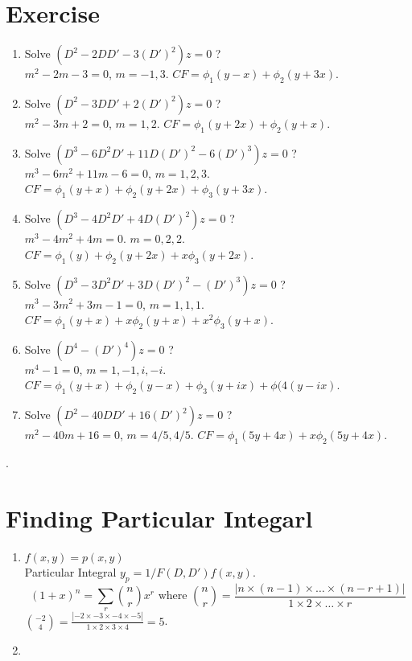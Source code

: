 \section*{Exercise}
\begin{enumerate}
	\item Solve $(D^2-2DD' - 3(D')^2)z = 0$ ?\\
	$m^2 - 2m - 3 = 0$, $m = -1,3$.
	$CF = \phi_1(y-x) + \phi_2(y+3x)$.
	\item Solve $(D^2 -3DD' + 2(D')^2)z = 0$ ?\\
	$m^2 - 3m + 2 = 0$, $m = 1,2$.
	$CF = \phi_1(y+2x) + \phi_2(y+x)$.
	\item Solve $(D^3-6D^2D' + 11D(D')^2 - 6(D')^3)z = 0$ ?\\
	$m^3 - 6m^2 + 11m - 6 = 0$, $m = 1, 2, 3$.
	$CF = \phi_1(y+x) + \phi_2(y+2x) + \phi_3(y+3x)$.
	\item Solve  $(D^3 - 4D^2D' + 4D(D')^2)z = 0$ ?\\
	$m^3 - 4m^2 + 4m = 0$. $m = 0, 2,2$.
	$CF = \phi_1(y) + \phi_2(y+2x) + x\phi_3(y+2x)$.
	\item Solve $(D^3-3D^2D'+3D(D')^2 - (D')^3)z = 0$ ?\\
	$m^3 - 3m^2 + 3m -1 = 0$, $m = 1,1,1$.
	$CF = \phi_1(y+x) + x\phi_2(y+x) + x^2\phi_3(y+x)$.
	\item Solve $(D^4-(D')^4)z = 0$ ? \\
	$m^4 - 1 = 0$, $m = 1,-1,i,-i$.
	$CF = \phi_1(y+x) + \phi_2(y-x) + \phi_3(y+ix) + \phi(4(y-ix)$.
	\item Solve $(D^2 - 40DD' + 16(D')^2)z = 0$ ? \\
	$m^2 - 40m + 16 = 0$, $m = 4/5, 4/5$.
	$CF = \phi_1(5y+4x) + x\phi_2(5y+4x)$.
\end{enumerate}.

\section{Finding Particular Integarl}
\begin{enumerate}
	\item $f(x,y) = p(x,y)$\\
	Particular Integral $y_p = 1/F(D,D') f(x,y)$.
		$$(1+x)^n = \sum_r \binom{n}{r} x^r \text{ where } \binom{n}{r} = \frac{|n \times (n-1) \times \dots \times (n-r+1)|}{1 \times 2 \times \dots \times r}$$
		$\binom{-2}{4} = \frac{|-2 \times -3 \times -4 \times -5|}{1 \times 2 \times 3 \times 4} = 5$.
	\item
\end{enumerate}

